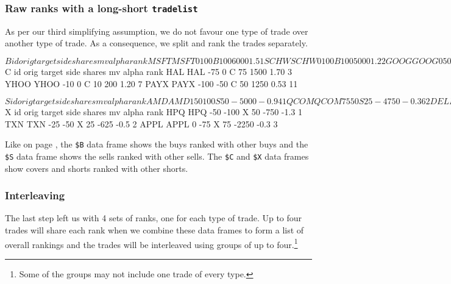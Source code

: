 \documentclass{article}
\begin{document}
\subsubsection{Raw ranks with a long-short \texttt{tradelist}}

As per our third simplifying assumption, we do not favour one type of
trade over another type of trade.  As a consequence, we split and rank
the trades separately.

\begin{Schunk}
\begin{Soutput}
$B
       id orig target side shares   mv alpha rank
MSFT MSFT    0    100    B    100 6000   1.5    1
SCHW SCHW    0    100    B    100 5000   1.2    2
GOOG GOOG    0     50    B     50 1000   1.1    3
GM     GM  100    200    B    100 3000   1.0    4

$C
       id orig target side shares   mv alpha rank
HAL   HAL  -75      0    C     75 1500  1.70    3
YHOO YHOO  -10      0    C     10  200  1.20    7
PAYX PAYX -100    -50    C     50 1250  0.53   11

$S
       id orig target side shares    mv alpha rank
AMD   AMD  150    100    S     50 -5000 -0.94    1
QCOM QCOM   75     50    S     25 -4750 -0.36    2
DELL DELL   50      0    S     50 -5500 -0.15    3

$X
       id orig target side shares    mv alpha rank
HPQ   HPQ  -50   -100    X     50  -750  -1.3    1
TXN   TXN  -25    -50    X     25  -625  -0.5    2
APPL APPL    0    -75    X     75 -2250  -0.3    3
\end{Soutput}
\end{Schunk}

Like on page \pageref{Creating raw ranks for a long-only portfolio},
the \texttt{\$B} data frame shows the buys ranked with other buys and
the \texttt{\$S} data frame shows the sells ranked with other sells.
The \texttt{\$C} and \texttt{\$X} data frames show covers and shorts
ranked with other shorts.

\subsubsection{Interleaving}

The last step left us with 4 sets of ranks, one
for each type of trade.  Up to four trades will share each rank when
we combine these data frames to form a list of overall rankings and
the trades will be interleaved using groups of up to
four.\protect\footnote{Some of the groups may not include one trade of
every type.}
\end{document}
